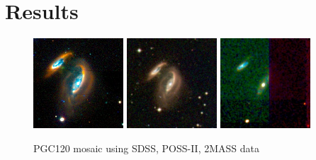 \documentclass[authoryear, 12pt,5p, times]{elsarticle}
\begin{document}
\section{Results\label{results-sec}}
\begin{figure}[t!]
\centering
	\includegraphics[width=0.3\textwidth]{figures/SDSS_120_LOW}
	\includegraphics[width=0.3\textwidth]{figures/DSS_120_BEST}	
	\includegraphics[width=0.3\textwidth]{figures/2MASS_120_BEST}
	\caption{PGC120 mosaic using SDSS, POSS-II, 2MASS data }
	\label{fig:comparison}
\end{figure}
\end{document}

